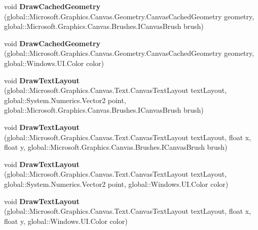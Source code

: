 \begin{DoxyCompactItemize}
void {\bfseries Draw\+Cached\+Geometry} (global\+::\+Microsoft.\+Graphics.\+Canvas.\+Geometry.\+Canvas\+Cached\+Geometry geometry, global\+::\+Microsoft.\+Graphics.\+Canvas.\+Brushes.\+I\+Canvas\+Brush brush)
\item 
\mbox{\label{class_microsoft_1_1_graphics_1_1_canvas_1_1_canvas_drawing_session_aab2e861f7527e90b52133b04b9c53d5c}} 
void {\bfseries Draw\+Cached\+Geometry} (global\+::\+Microsoft.\+Graphics.\+Canvas.\+Geometry.\+Canvas\+Cached\+Geometry geometry, global\+::\+Windows.\+U\+I.\+Color color)
\item 
\mbox{\label{class_microsoft_1_1_graphics_1_1_canvas_1_1_canvas_drawing_session_ac411bf305542173da9359ddcec59b4f8}} 
void {\bfseries Draw\+Text\+Layout} (global\+::\+Microsoft.\+Graphics.\+Canvas.\+Text.\+Canvas\+Text\+Layout text\+Layout, global\+::\+System.\+Numerics.\+Vector2 point, global\+::\+Microsoft.\+Graphics.\+Canvas.\+Brushes.\+I\+Canvas\+Brush brush)
\item 
\mbox{\label{class_microsoft_1_1_graphics_1_1_canvas_1_1_canvas_drawing_session_afd9a250b03dc041f2fd9ab19b86e51b0}} 
void {\bfseries Draw\+Text\+Layout} (global\+::\+Microsoft.\+Graphics.\+Canvas.\+Text.\+Canvas\+Text\+Layout text\+Layout, float x, float y, global\+::\+Microsoft.\+Graphics.\+Canvas.\+Brushes.\+I\+Canvas\+Brush brush)
\item 
\mbox{\label{class_microsoft_1_1_graphics_1_1_canvas_1_1_canvas_drawing_session_ac7050f4cc17cf5890039e48bc61d06c9}} 
void {\bfseries Draw\+Text\+Layout} (global\+::\+Microsoft.\+Graphics.\+Canvas.\+Text.\+Canvas\+Text\+Layout text\+Layout, global\+::\+System.\+Numerics.\+Vector2 point, global\+::\+Windows.\+U\+I.\+Color color)
\item 
\mbox{\label{class_microsoft_1_1_graphics_1_1_canvas_1_1_canvas_drawing_session_a70f84504ad50ff1b7aacfb5c1b7b1979}} 
void {\bfseries Draw\+Text\+Layout} (global\+::\+Microsoft.\+Graphics.\+Canvas.\+Text.\+Canvas\+Text\+Layout text\+Layout, float x, float y, global\+::\+Windows.\+U\+I.\+Color color)

\end{DoxyCompactItemize}
